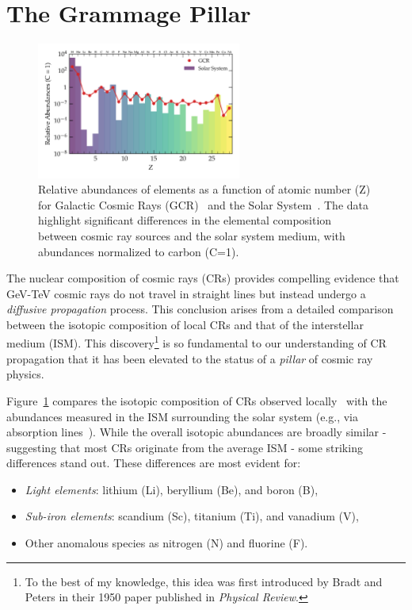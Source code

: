 \section{The Grammage Pillar}
\label{sec:pillar}

\begin{figure}[t]
\centering
\includegraphics[width=0.6\textwidth]{figures/composition.pdf} 
\caption{Relative abundances of elements as a function of atomic number (Z) for Galactic Cosmic Rays (GCR)~\cite{} and the Solar System~\cite{}. The data highlight significant differences in the elemental composition between cosmic ray sources and the solar system medium, with abundances normalized to carbon (C=1).}
\label{fig:composition}
\end{figure}

The nuclear composition of cosmic rays (CRs) provides compelling evidence that GeV-TeV cosmic rays do not travel in straight lines but instead undergo a \emph{diffusive propagation} process. This conclusion arises from a detailed comparison between the isotopic composition of local CRs and that of the interstellar medium (ISM). This discovery\footnote{To the best of my knowledge, this idea was first introduced by Bradt and Peters in their 1950 paper published in \emph{Physical Review}.} is so fundamental to our understanding of CR propagation that it has been elevated to the status of a \emph{pillar} of cosmic ray physics.  

Figure~\ref{fig:composition} compares the isotopic composition of CRs observed locally~\cite{} with the abundances measured in the ISM surrounding the solar system (e.g., via absorption lines~\cite{}). While the overall isotopic abundances are broadly similar - suggesting that most CRs originate from the average ISM - some striking differences stand out. 
%
These differences are most evident for:  
%
\begin{itemize}
\item \emph{Light elements}: lithium (Li), beryllium (Be), and boron (B),  
\item \emph{Sub-iron elements}: scandium (Sc), titanium (Ti), and vanadium (V),  
\item Other anomalous species as nitrogen (N) and fluorine (F).  
\end{itemize}

